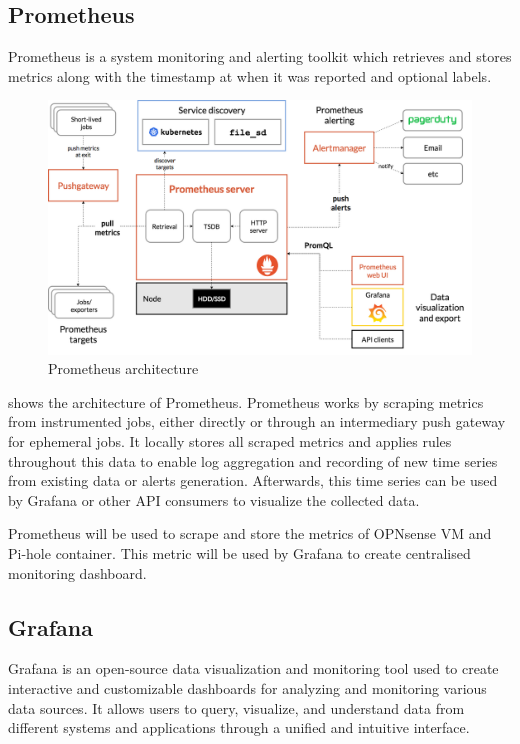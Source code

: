 \documentclass[../index.tex]{subfiles}
\begin{document}
\subsection{Prometheus}

Prometheus is a system monitoring and alerting toolkit which retrieves and stores metrics along with
the timestamp at when it was reported and optional labels.

\begin{figure}[h]
  \includegraphics[width=\textwidth]{../assets/prometheus_architecture.png}
  \caption{Prometheus architecture}
  \label{fig:prometheus_architecture}
\end{figure}

 shows the architecture of Prometheus. Prometheus works by
scraping metrics from instrumented jobs, either directly or through an intermediary push gateway for
ephemeral jobs. It locally stores all scraped metrics and applies rules throughout this data to
enable log aggregation and recording of new time series from existing data or alerts generation.
Afterwards, this time series can be used by Grafana or other API consumers to visualize the
collected data.

Prometheus will be used to scrape and store the metrics of OPNsense VM and Pi-hole container. This
metric will be used by Grafana to create centralised monitoring dashboard.

\subsection{Grafana}

Grafana is an open-source data visualization and monitoring tool used to create interactive and
customizable dashboards for analyzing and monitoring various data sources. It allows users to query,
visualize, and understand data from different systems and applications through a unified and
intuitive interface.
\end{document}

